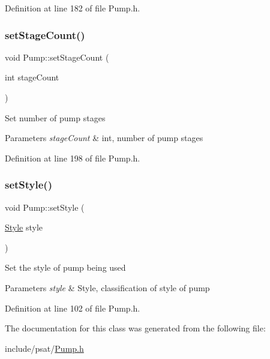 Definition at line 182 of file Pump.\+h.

\mbox{\label{class_pump_a28943405616a792c970b7e9bbf01c1b2}} 
\subsubsection{\texorpdfstring{set\+Stage\+Count()}{setStageCount()}}
{\footnotesize\ttfamily void Pump\+::set\+Stage\+Count (\begin{DoxyParamCaption}\item[{int}]{stage\+Count }\end{DoxyParamCaption})\hspace{0.3cm}{\ttfamily [inline]}}

Set number of pump stages 
\begin{DoxyParams}{Parameters}
{\em stage\+Count} & int, number of pump stages \\
\hline
\end{DoxyParams}


Definition at line 198 of file Pump.\+h.

\mbox{\label{class_pump_a4852cb47f40a46ba84c7dff91d1abd53}} 
\subsubsection{\texorpdfstring{set\+Style()}{setStyle()}}
{\footnotesize\ttfamily void Pump\+::set\+Style (\begin{DoxyParamCaption}\item[{\hyperlink{class_pump_aef354601ce4218258cc898b35a1e90ff}{Style}}]{style }\end{DoxyParamCaption})\hspace{0.3cm}{\ttfamily [inline]}}

Set the style of pump being used 
\begin{DoxyParams}{Parameters}
{\em style} & Style, classification of style of pump \\
\hline
\end{DoxyParams}


Definition at line 102 of file Pump.\+h.



The documentation for this class was generated from the following file\+:\begin{DoxyCompactItemize}
\item 
include/psat/\hyperlink{_pump_8h}{Pump.\+h}\end{DoxyCompactItemize}
